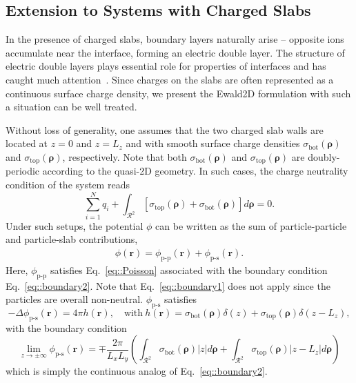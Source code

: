 \subsection{Extension to Systems with Charged Slabs}\label{sec::sysslabs}

In the presence of charged slabs, boundary layers naturally arise -- opposite ions accumulate near the interface, forming an electric double layer. The structure of electric double layers plays essential role for properties of interfaces and has caught much attention~\cite{messina2004effect,breitsprecher2014coarse,moreira2002simulations}. Since charges on the slabs are often represented as a continuous surface charge density, we present the Ewald2D formulation with such a situation can be well treated.

Without loss of generality, one assumes that the two charged slab walls are located at $z=0$ and $z=L_z$ and with smooth surface charge densities $\sigma_{\mathrm{bot}}(\bm{\rho})$ and $\sigma_{\mathrm{top}}(\bm{\rho})$, respectively. Note that both $\sigma_{\mathrm{bot}}(\bm{\rho})$ and $\sigma_{\mathrm{top}}(\bm{\rho})$ are doubly-periodic according to the quasi-2D geometry. In such cases, the charge neutrality condition of the system reads
\begin{equation}\label{eq::chargeneu}
 	\sum_{i=1}^{N}q_{i} + \int_{\mathcal{R}^2} \left[\sigma_{\mathrm{top}} (\bm{\rho}) + \sigma_{\mathrm{bot}}(\bm{\rho}) \right] d\bm{\rho} = 0.
\end{equation} 
Under such setups, the potential $\phi$ can be written as the sum of particle-particle and particle-slab contributions,
\begin{align}
	\phi(\bm{r})=\phi_{\text{p-p}}(\bm{r})+\phi_{\text{p-s}}(\bm{r}).
\end{align}
Here, $\phi_{\text{p-p}}$ satisfies Eq.~\eqref{eq::Poisson} associated with the boundary condition Eq.~\eqref{eq::boundary2}. Note that Eq.~\eqref{eq::boundary1} does not apply since the particles are overall non-neutral. $\phi_{\text{p-s}}$ satisfies 
\begin{equation}\label{eq::PoionWall}
	-\Delta \phi_{\text{p-s}}(\bm{r}) = 4\pi h(\bm{r}), \quad \text{with}~ h(\bm{r}) =  \sigma_{\mathrm{bot}}(\bm{\rho}) \delta(z) + \sigma_{\mathrm{top}}(\bm{\rho}) \delta(z-L_z),
\end{equation}
with the boundary condition
\begin{equation}\label{eq::boundionwall}
	\lim_{z\rightarrow\pm\infty}\phi_{\text{p-s}}(\bm{r})=\mp \frac{2\pi}{L_xL_y}\left(\int_{\mathcal{R}^2}\sigma_{\mathrm{bot}}(\bm{\rho})|z|d\bm{\rho}+\int_{\mathcal{R}^2}\sigma_{\mathrm{top}}(\bm{\rho})|z-L_z|d\bm{\rho}\right)
\end{equation}
which is simply the continuous analog of Eq.~\eqref{eq::boundary2}. 

